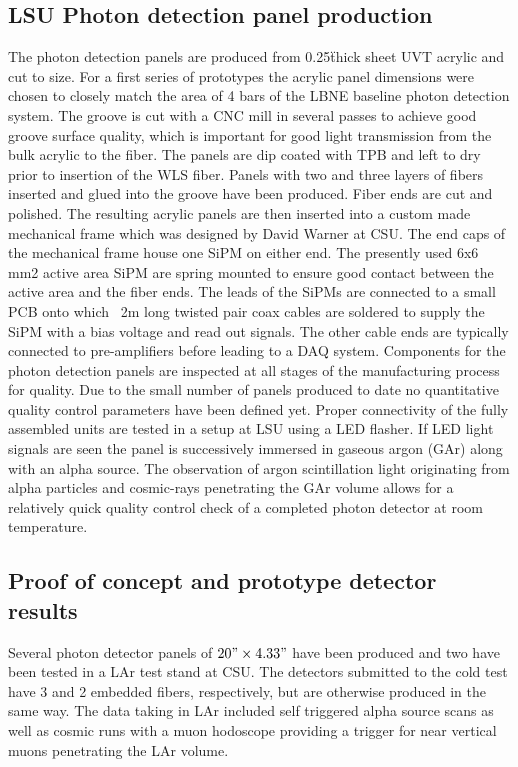 \subsection{LSU Photon detection panel production}
The photon detection panels are produced from 0.25\" thick
sheet UVT acrylic and cut to size. For a first series of prototypes
the acrylic panel dimensions were chosen to closely match the area of
4 bars of the LBNE baseline photon detection system.  The groove is
cut with a CNC mill in several passes to achieve good groove surface
quality, which is important for good light transmission from the bulk
acrylic to the fiber. The panels are dip coated with TPB and left to
dry prior to insertion of the WLS fiber. Panels with two and three
layers of fibers inserted and glued into the groove have been
produced. Fiber ends are cut and polished.  The resulting acrylic
panels are then inserted into a custom made mechanical frame which was
designed by David Warner at CSU. The end caps of the mechanical frame
house one SiPM on either end. The presently used 6x6 mm2 active area
SiPM are spring mounted to ensure good contact between the active area
and the fiber ends.  The leads of the SiPMs are connected to a small
PCB onto which ~2m long twisted pair coax cables are soldered to
supply the SiPM with a bias voltage and read out signals. The other
cable ends are typically connected to pre-amplifiers before leading to
a DAQ system.  Components for the photon detection panels are
inspected at all stages of the manufacturing process for quality. Due
to the small number of panels produced to date no quantitative quality
control parameters have been defined yet.  Proper connectivity of the
fully assembled units are tested in a setup at LSU using a LED
flasher. If LED light signals are seen the panel is successively
immersed in gaseous argon (GAr) along with an alpha source. The
observation of argon scintillation light originating from alpha
particles and cosmic-rays penetrating the GAr volume allows for a
relatively quick quality control check of a completed photon detector
at room temperature.

\subsection{Proof of concept and prototype detector results}
Several photon detector panels of $20" \times 4.33"$ have been
produced and two have been tested in a LAr test stand at CSU. The
detectors submitted to the cold test have 3 and 2 embedded fibers,
respectively, but are otherwise produced in the same way. The data
taking in LAr included self triggered alpha source scans as well as
cosmic runs with a muon hodoscope providing a trigger for near
vertical muons penetrating the LAr volume.
